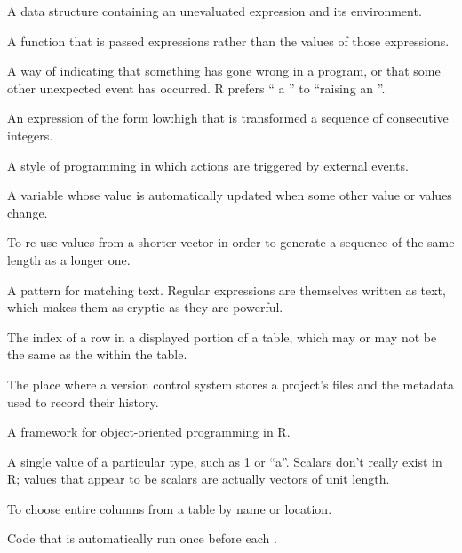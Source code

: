 \begin{description}
A data structure containing an unevaluated expression and its environment.

A function that is passed expressions rather than the values of those expressions.

A way of indicating that something has gone wrong in a program,
or that some other unexpected event has occurred.
R prefers `` a ''
to ``raising an ''.

An expression of the form low:high
that is transformed a sequence of consecutive integers.

A style of programming in which actions are triggered by external events.

A variable whose value is automatically updated when some other value or values change.

To re-use values from a shorter vector in order to generate
a sequence of the same length as a longer one.

A pattern for matching text.
Regular expressions are themselves written as text,
which makes them as cryptic as they are powerful.

The index of a row in a displayed portion of a table,
which may or may not be the same as the 
within the table.

The place where a version control system stores a project's files
and the metadata used to record their history.

A framework for object-oriented programming in R.

A single value of a particular type, such as 1 or ``a''.
Scalars don't really exist in R;
values that appear to be scalars are actually vectors of unit length.

To choose entire columns from a table by name or location.

Code that is automatically run once before each .


\end{description}
